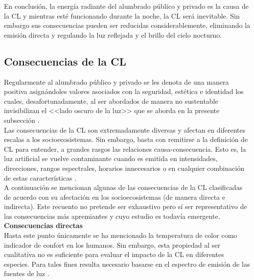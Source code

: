 En conclusión, la energía radiante del alumbrado público y privado es la causa de la CL y mientras esté funcionando durante la noche, la CL será inevitable. Sin embargo sus consecuencias pueden ser reducidas considerablemente, eliminando la emisión directa y regulando la luz reflejada y el brillo del cielo nocturno.\\ 

\subsection{Consecuencias de la CL}
\label{subsec:consecuenciascl}

Regularmente al alumbrado público y privado se les denota de una manera positiva asignándoles valores asociados con la seguridad, estética e identidad los cuales, desafortunadamente, al ser abordados de manera no sustentable invisibilizan el <<lado oscuro de la luz>> que se aborda en la presente subsección \citep{Globaldiscussion,LibroCL}.\\ 

Las consecuencias de la CL son extremadamente diversas y afectan en diferentes escalas a los socioecosistemas. Sin embargo, basta con remitirse a la definición de CL para entender, a grandes rasgos las relaciones causa-consecuencia. Esto es, la luz artificial se vuelve contaminante cuando es emitida en intensidades, direcciones, rangos espectrales, horarios innecesarios o en cualquier combinación de estas características \citep{AtlasREPSA,LibroCL,Stone2017}.\\ 

A continuación se mencionan algunas de las consecuencias de la CL clasificadas de acuerdo con su afectación en los socioecosistemas (de manera directa e indirecta). Este recuento no pretende ser exhaustivo pero sí ser representativo de las consecuencias más apremiantes y cuyo estudio es todavía emergente.\\

\textbf{Consecuencias directas}\\ 

Hasta este punto únicamente se ha mencionado la temperatura de color como indicador de confort en los humanos. Sin embargo, esta propiedad al ser cualitativa no es suficiente para evaluar el impacto de la CL en diferentes especies. Para tales fines resulta necesario basarse en el espectro de emisión de las fuentes de luz \citep{CEI2017}.\\

\newpage


